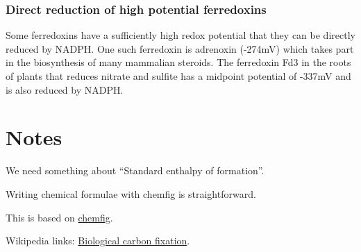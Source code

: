 \documentclass{article}
\begin{document}
\subsubsection{Direct reduction of high potential ferredoxins}
Some ferredoxins have a sufficiently high redox potential that they can be directly
reduced by NADPH\@. One such ferredoxin is adrenoxin (-274mV) which takes part in the
biosynthesis of many mammalian steroids.  The ferredoxin Fd3 in the roots of plants that
reduces nitrate and sulfite has a midpoint potential of -337mV and is also reduced by
NADPH\@.


\pagebreak
\section{Notes}\label{sec_notes}

We need something about ``Standard enthalpy of formation''.

Writing chemical formulae with chemfig is straightforward.

This is based on \href{https://www.overleaf.com/learn/latex/Chemistry_formulae}{chemfig}.

Wikipedia links:
\href{https://en.wikipedia.org/wiki/Biological_carbon_fixation}{Biological carbon fixation}.
\end{document}
